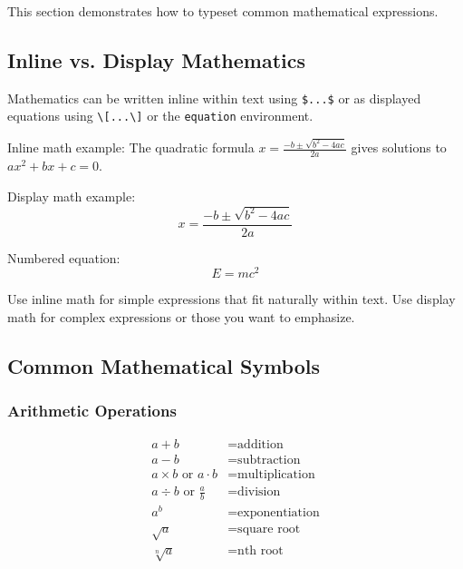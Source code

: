 \documentclass[11pt,a4paper]{article}
\begin{document}
This section demonstrates how to typeset common mathematical expressions.

\subsection{Inline vs. Display Mathematics}

Mathematics can be written inline within text using \verb|$...$| or as displayed equations using \verb|\[...\]| or the \verb|equation| environment.

Inline math example: The quadratic formula $x = \frac{-b \pm \sqrt{b^2 - 4ac}}{2a}$ gives solutions to $ax^2 + bx + c = 0$.

Display math example:
\[
x = \frac{-b \pm \sqrt{b^2 - 4ac}}{2a}
\]

Numbered equation:
\begin{equation}
    E = mc^2
\end{equation}

\begin{notebox}
Use inline math for simple expressions that fit naturally within text. Use display math for complex expressions or those you want to emphasize.
\end{notebox}

\subsection{Common Mathematical Symbols}

\subsubsection{Arithmetic Operations}
\begin{align}
    a + b &= \text{addition} \\
    a - b &= \text{subtraction} \\
    a \times b \text{ or } a \cdot b &= \text{multiplication} \\
    a \div b \text{ or } \frac{a}{b} &= \text{division} \\
    a^b &= \text{exponentiation} \\
    \sqrt{a} &= \text{square root} \\
    \sqrt[n]{a} &= \text{nth root}
\end{align}
\end{document}
